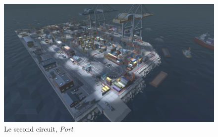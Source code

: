 \documentclass[12pt,a4paper]{article}
\begin{document}
        \begin{figure}[t]
            \centering
            \includegraphics[width=15cm]{trackport.png}
            \caption{Le second circuit, \textsl{Port}}
            \label{fig:track2}
        \end{figure}
\end{document}
